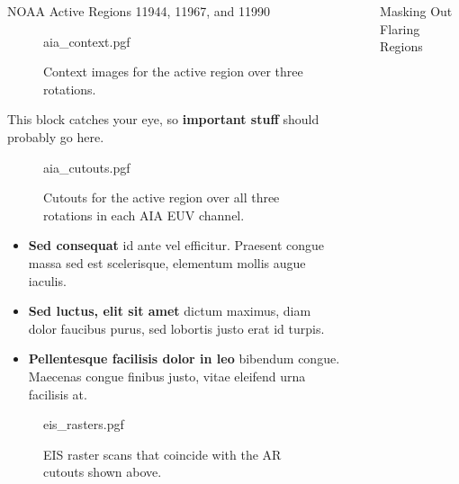 \documentclass[final]{beamer}
\newlength{\sepwidth}
\newlength{\colwidth}
\newcommand{\separatorcolumn}{\begin{column}{\sepwidth}\end{column}}
\begin{document}
\begin{frame}[t]
\begin{columns}[t]
\begin{column}{\colwidth}
\begin{block}{NOAA Active Regions 11944, 11967, and 11990}
    \begin{figure}
      \centering
      {aia_context.pgf}
      \caption{Context images for the active region over three rotations.} 
      \label{fig:aia_context}
    \end{figure}


    This block catches your eye, so \textbf{important stuff} should probably go
    here.
  
    \begin{figure}
      \centering
      {aia_cutouts.pgf}
      \caption{Cutouts for the active region over all three rotations in each AIA EUV channel.} 
      \label{fig:aia_cutouts}
    \end{figure}


    \begin{itemize}
      \item \textbf{Sed consequat} id ante vel efficitur. Praesent congue massa
        sed est scelerisque, elementum mollis augue iaculis.
      \item \textbf{Sed luctus, elit sit amet} dictum maximus, diam dolor
        faucibus purus, sed lobortis justo erat id turpis.
      \item \textbf{Pellentesque facilisis dolor in leo} bibendum congue.
        Maecenas congue finibus justo, vitae eleifend urna facilisis at.
    \end{itemize}

    \begin{figure}
      \centering
      {eis_rasters.pgf}
      \caption{EIS raster scans that coincide with the AR cutouts shown above.} 
      \label{fig:eis_rasters}
    \end{figure}
  
  \end{block}

\end{column}
\separatorcolumn  
\begin{column}{\colwidth}

  \begin{block}{Masking Out Flaring Regions}


\end{block}
\end{column}
\end{columns}
\end{frame}
\end{document}
